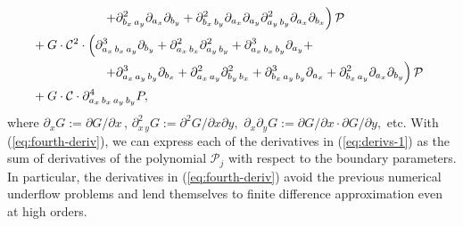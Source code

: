 \begin{align}
  \MoveEqLeft[10] \left. \qquad\qquad\qquad +\partial^2_{b_x\, a_y} \partial_{a_x} \partial_{b_y} + \partial^2_{b_x\, b_y} \partial_{a_x} \partial_{a_y} \partial^2_{a_y\, b_y} \partial_{a_x} \partial_{b_x} \right) \mathcal{P} &  \nonumber \\
  \MoveEqLeft[10] \,\, + G \cdot \mathcal{C}^2 \cdot \left( \partial^3_{a_x\,b_x\,a_y} \partial_{b_y} + \partial^2_{a_x\,b_x}\partial^2_{a_y\,b_y} + \partial^3_{a_x\,b_x\,b_y}\partial_{a_y}  + \right.& \nonumber \\
  \MoveEqLeft[10] \left. \qquad\qquad\qquad + \partial^3_{a_x\,a_y\,b_y} \partial_{b_x} + \partial^2_{a_x\,a_y} \partial^2_{b_y\,b_x} + \partial^3_{b_x\,a_y\,b_y}\partial_{a_x} + \partial^2_{b_x\,a_y}\partial_{a_x}\partial_{b_y} \right) \mathcal{P} & \nonumber \\
  \MoveEqLeft[10] \,\, + G \cdot \mathcal{C} \cdot \partial^4_{a_x\,b_x\,a_y\,b_y} P,& \label{eq:fourth-deriv}
\end{align}
where $\partial_{x}G := \partial G/\partial x\,$,
$\partial^2_{x\,y}G := \partial^2 G/\partial x \partial y,$
$\partial_{x}\partial_{y}G := \partial G/\partial x \cdot \partial
G/\partial y,$ etc.  With (\ref{eq:fourth-deriv}), we can express each
of the derivatives in (\ref{eq:derivs-1}) as the sum of derivatives of
the polynomial $\mathcal{P}_j$ with respect to the boundary
parameters. In particular, the derivatives in (\ref{eq:fourth-deriv})
avoid the previous numerical underflow problems and lend themselves to
finite difference approximation even at high orders.

